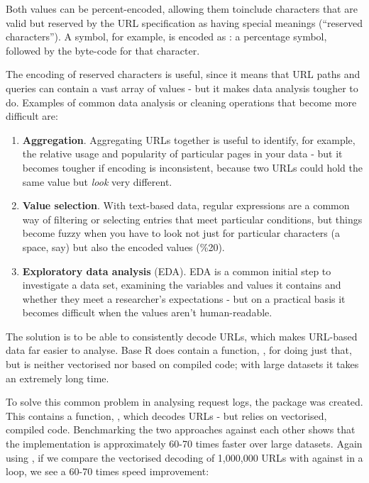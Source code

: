Both values can be percent-encoded, allowing them toinclude characters
that are valid but reserved by the URL specification as having special
meanings (``reserved characters''). A \samp{\#} symbol, for example, is
encoded as : a percentage symbol, followed by the byte-code
for that character.

The encoding of reserved characters is useful, since it means that URL
paths and queries can contain a vast array of values - but it makes data
analysis tougher to do. Examples of common data analysis or cleaning
operations that become more difficult are:

\begin{enumerate}
\def\labelenumi{\arabic{enumi}.}
\itemsep1pt\parskip0pt
\item
  \textbf{Aggregation}. Aggregating URLs together is useful to identify,
  for example, the relative usage and popularity of particular pages in
  your data - but it becomes tougher if encoding is inconsistent,
  because two URLs could hold the same value but \emph{look} very
  different.
\item
  \textbf{Value selection}. With text-based data, regular expressions
  are a common way of filtering or selecting entries that meet
  particular conditions, but things become fuzzy when you have to look
  not just for particular characters (a space, say) but also the encoded
  values (\%20).
\item
  \textbf{Exploratory data analysis} (EDA). EDA is a common initial step
  to investigate a data set, examining the variables and values it
  contains and whether they meet a researcher's expectations - but on a
  practical basis it becomes difficult when the values aren't
  human-readable.
\end{enumerate}

The solution is to be able to consistently decode URLs, which makes
URL-based data far easier to analyse. Base R does contain a function,
, for doing just that, but is neither vectorised nor
based on compiled code; with large datasets it takes an extremely long
time.

To solve this common problem in analysing request logs, the
 package was created. This contains a function,
, which decodes URLs - but relies on vectorised,
compiled code. Benchmarking the two approaches against each other shows
that the  implementation is approximately 60-70 times
faster over large datasets. Again using , if we
compare the vectorised decoding of 1,000,000 URLs with 
against  in a  loop, we see a 60-70 times
speed improvement:


